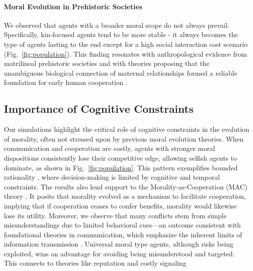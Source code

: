 \documentclass[letterpaper]{article} %
\begin{document}
\paragraph{Moral Evolution in Prehistoric Societies} 
We observed that agents with a broader moral scope do not always prevail. Specifically, kin-focused agents tend to be more stable - it always becomes the type of agents lasting to the end except for a high social interaction cost scenario (Fig.~\ref{fig:population}). This finding resonates with anthropological evidence from matrilineal prehistoric societies \citep{holden2003matriliny, mattison2011evolutionary, wang2023ancient} and with theories proposing that the unambiguous biological connection of maternal relationships formed a reliable foundation for early human cooperation \citep{hamilton1964genetical}.



\subsection{Importance of Cognitive Constraints}
Our simulations highlight the critical role of cognitive constraints in the evolution of morality, often not stressed upon by previous moral evolution theories. When communication and cooperation are costly, agents with stronger moral dispositions consistently lose their competitive edge, allowing selfish agents to dominate, as shown in Fig.~\ref{fig:population}. This pattern exemplifies bounded rationality \citep{simon1991bounded}, where decision-making is limited by cognitive and temporal constraints. The results also lend support to the Morality-as-Cooperation (MAC) theory \citep{Curry2019MAC}. It posits that morality evolved as a mechanism to facilitate cooperation, implying that if cooperation ceases to confer benefits, morality would likewise lose its utility. Moreover, we observe that many conflicts stem from simple misunderstandings due to limited behavioral cues—an outcome consistent with foundational theories in communication, which emphasize the inherent limits of information transmission \citep{shannon1948mathematical, deutsch1973resolution}. Universal moral type agents, although risks being exploited, wins an advantage for avoiding being misunderstood and targeted. This connects to theories like reputation and costly signaling \citep{alt1988reputation, gintis2001costly, nowak2005evolution}
\end{document}
